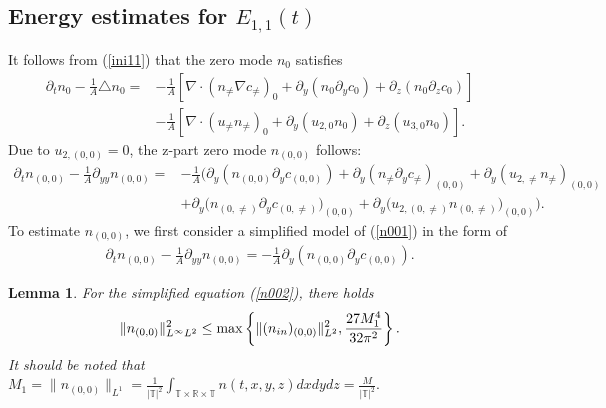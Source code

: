 \documentclass[12pt, reqno]{amsart}
\newtheorem{lemma}{Lemma}[section]
\numberwithin{equation}{section}
\begin{document}
	\subsection{Energy estimates for $E_{1,1}(t)$}		
	It follows from (\ref{ini11}) that the zero mode $ n_{0} $ satisfies
	\begin{equation}\label{eq:n-zero mode}
		\begin{aligned}
			\partial_t n_{0}-\frac{1}{A}\triangle n_{0}=&-\frac{1}{A}\left[\nabla\cdot(n_{\neq}\nabla c_{\neq})_{0}+\partial_{y}(n_{0}\partial_{y}c_{0})+\partial_{z}(n_{0}\partial_{z}c_{0}) \right]\\&-\frac{1}{A}\left[\nabla\cdot(u_{\neq}n_{\neq})_{0}+\partial_{y}(u_{2,0}n_{0})+\partial_{z}(u_{3,0}n_{0}) \right].
		\end{aligned}
	\end{equation}
	Due to $u_{2,(0,0)}=0$, the z-part zero mode $ n_{(0,0)} $ follows:
	\begin{equation}\label{n001}
		\begin{aligned}
			\partial_t n_{(0,0)}-\frac{1}{A}\partial_{yy} n_{(0,0)}=&-\frac{1}{A}\Big(\partial_{y}\left(n_{(0,0)}\partial_{y}c_{(0,0)} \right)+\partial_{y}(n_{\neq}\partial_y c_{\neq})_{(0,0)}+\partial_{y}(u_{2,\neq}n_{\neq})_{(0,0)} \\&+\partial_{y}\big(n_{(0,\neq)}\partial_{y}c_{(0,\neq)} \big)_{(0,0)}+\partial_{y}\big(u_{2,(0,\neq)}n_{(0,\neq)} \big)_{(0,0)} \Big).
		\end{aligned}
	\end{equation}
	To  estimate $n_{(0,0)}$, we first consider a simplified model of (\ref{n001}) in the form of
	\begin{equation}\label{n002}
		\begin{aligned}
			\partial_t n_{(0,0)}-\frac{1}{A}\partial_{yy} n_{(0,0)}=-\frac{1}{A}\partial_{y}\left(n_{(0,0)}
			\partial_{y}c_{(0,0)}\right).
		\end{aligned}
	\end{equation}
	\begin{lemma}\label{c00_lemma1}
		For the simplified equation (\ref{n002}), there holds
		\begin{align*}
			\|n_{(0,0)}\|^2_{L^{\infty}L^2}\leq \max\left\{\|(n_{\rm in})_{(0,0)}\|^2_{L^2},\frac{27M_1^4}{32\pi^2}\right\}.
		\end{align*}
		It should be noted that $M_1=\|n_{(0,0)}\|_{L^1}=
		\frac{1}{|\mathbb{T}|^2}\int_{\mathbb{T}\times\mathbb{R}\times\mathbb{T}}n(t,x,y,z)dxdydz=\frac{M}{|\mathbb{T}|^2}.$
	\end{lemma} 
	
\end{document}

